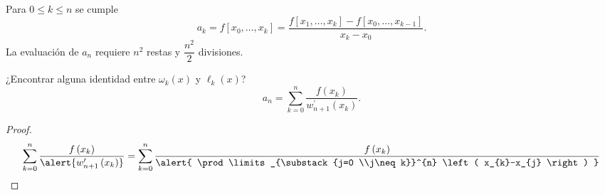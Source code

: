 \begin{frame}
	\begin{theorem}
		Para $0\leq k\leq n$ se cumple
		\begin{equation*}
			a_{k}=
			f\left[x_{0},\ldots,x_{k}\right]=
			\dfrac{
			f\left[x_{1},\ldots,x_{k}\right]-
			f\left[x_{0},\ldots,x_{k-1}\right]
			}{x_{k}-x_{0}}.
		\end{equation*}
		La evaluación de $a_{n}$ requiere $n^{2}$ restas y
		$\dfrac{n^{2}}{2}$ divisiones.
	\end{theorem}


	\begin{theorem}
		¿Encontrar alguna identidad entre $\omega_{k}\left(x\right)$ y
		$\ell_{k}\left(x\right)$?
		\begin{equation*}
			a_{n}=
			\sum\limits_{k=0}^{n}
			\dfrac{
				f\left(x_{k}\right)
			}{
				w^{\prime}_{n+1}
				\left(x_{k}\right)
			}.
		\end{equation*}
	\end{theorem}

	\begin{proof}
		\begin{equation*}
			\sum\limits_{k=0}^{n}
			\dfrac{
				f\left(x_{k}\right)
			}{
				\alert{
					w^{\prime}_{n+1}
					\left(x_{k}\right)
				}
			}=
			\sum\limits_{k=0}^{n}
			\dfrac{
				f\left(x_{k}\right)
			}{
				\alert{
					\prod\limits_{\substack{j=0 \\j\neq k}}^{n}
					\left(
					x_{k}-x_{j}
					\right)
				}
			}
		\end{equation*}
	\end{proof}

\end{frame}